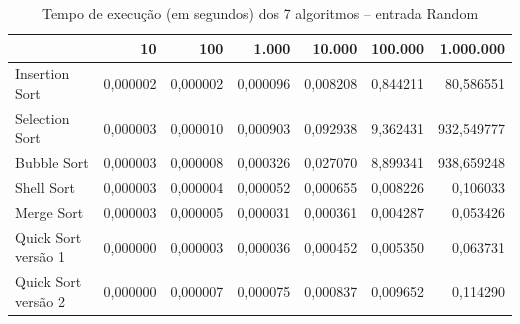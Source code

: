 \begin{table}[htbp]
    \centering
    \begin{tabular}{|l|r|r|r|r|r|r|}
        \hline
         & 10 & 100 & 1.000 & 10.000 & 100.000 & 1.000.000 \\
        \hline
        Insertion Sort & 0,000002 & 0,000002 & 0,000096 & 0,008208 & 0,844211 & 80,586551 \\
        \hline
        Selection Sort & 0,000003 & 0,000010 & 0,000903 & 0,092938 & 9,362431 & 932,549777 \\
        \hline
        Bubble Sort & 0,000003 & 0,000008 & 0,000326 & 0,027070 & 8,899341 & 938,659248 \\
        \hline
        Shell Sort & 0,000003 & 0,000004 & 0,000052 & 0,000655 & 0,008226 & 0,106033 \\
        \hline
        Merge Sort & 0,000003 & 0,000005 & 0,000031 & 0,000361 & 0,004287 & 0,053426 \\
        \hline
        Quick Sort versão 1 & 0,000000 & 0,000003 & 0,000036 & 0,000452 & 0,005350 & 0,063731 \\
        \hline
        Quick Sort versão 2 & 0,000000 & 0,000007 & 0,000075 & 0,000837 & 0,009652 & 0,114290 \\
        \hline
    \end{tabular}
    \caption{Tempo de execução (em segundos) dos 7 algoritmos -- entrada Random}
    \label{tab:comparacao_random}
\end{table}
